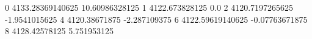 0 4133.28369140625 10.60986328125
1 4122.673828125 0.0
2 4120.7197265625 -1.9541015625
4 4120.38671875 -2.287109375
6 4122.59619140625 -0.07763671875
8 4128.42578125 5.751953125
